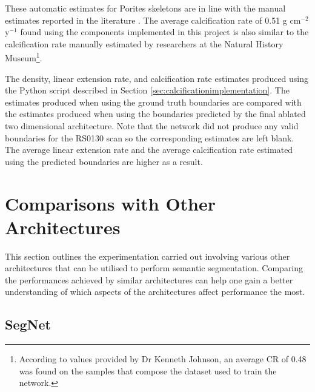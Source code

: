 These automatic estimates for Porites skeletons are in line with the manual estimates reported in the literature \cite{calcification1, calcification2}. The average calcification rate of 0.51 g cm$^{-2}$ y$^{-1}$ found using the components implemented in this project is also similar to the calcification rate manually estimated by researchers at the Natural History Museum\footnote{According to values provided by Dr Kenneth Johnson, an average CR of 0.48 was found on the samples that compose the dataset used to train the network.}.



\begin{table}[!t]
    \centering
    \caption{The density, linear extension rate, and calcification rate estimates produced using the Python script described in Section \ref{sec:calcificationimplementation}. The estimates produced when using the ground truth boundaries are compared with the estimates produced when using the boundaries predicted by the final ablated two dimensional architecture. Note that the network did not produce any valid boundaries for the RS0130 scan so the corresponding estimates are left blank. The average linear extension rate and the average calcification rate estimated using the predicted boundaries are higher as a result.}
    \small
    
    \label{tab:calcification}
\end{table}

\section{Comparisons with Other Architectures}

This section outlines the experimentation carried out involving various other architectures that can be utilised to perform semantic segmentation. Comparing the performances achieved by similar architectures can help one gain a better understanding of which aspects of the architectures affect performance the most.

\subsection{SegNet}

